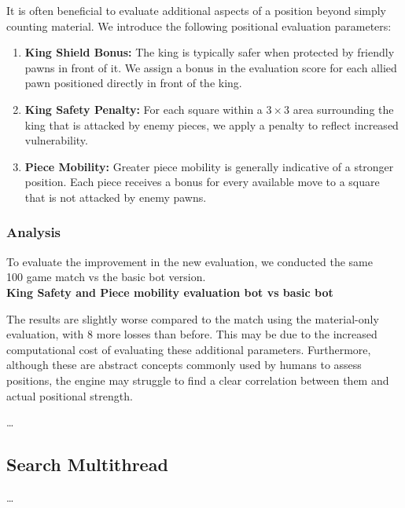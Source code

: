 It is often beneficial to evaluate additional aspects of a position beyond simply counting material. We introduce the following positional evaluation parameters:

\begin{enumerate}
    \item \textbf{King Shield Bonus:} The king is typically safer when protected by friendly pawns in front of it. We assign a bonus in the evaluation score for each allied pawn positioned directly in front of the king.

    \item \textbf{King Safety Penalty:} For each square within a $3 \times 3$ area surrounding the king that is attacked by enemy pieces, we apply a penalty to reflect increased vulnerability.

    \item \textbf{Piece Mobility:} Greater piece mobility is generally indicative of a stronger position. Each piece receives a bonus for every available move to a square that is not attacked by enemy pawns.
\end{enumerate}


\subsubsection{Analysis}

To evaluate the improvement in the new evaluation, we conducted the same\\
100 game match vs the basic bot version.\\ 

\textbf{King Safety and Piece mobility evaluation bot vs basic bot}\\
\medskip

The results are slightly worse compared to the match using the material-only evaluation, with 8 more losses than before. This may be due to the increased computational cost of evaluating these additional parameters. Furthermore, although these are abstract concepts commonly used by humans to assess positions, the engine may struggle to find a clear correlation between them and actual positional strength.

\ldots

\subsection{Search Multithread}

\ldots

